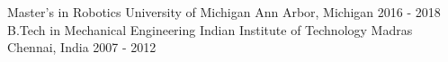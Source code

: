 

\begin{cventries2}
\cventry
{Master's in Robotics} %
{University of Michigan} %
{Ann Arbor, Michigan} %
{2016 - 2018} %
{}
\vspace{-0.3cm}
\cventry
{B.Tech in Mechanical Engineering} %
{Indian Institute of Technology Madras} %
{Chennai, India} %
{2007 - 2012} %
{}
\vspace{-0.6cm}
\end{cventries2}




